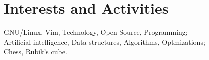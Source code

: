 \documentclass[a4paper,10pt]{article}
\begin{document}
\section{Interests and Activities}
    GNU/Linux, Vim, Technology, Open-Source, Programming; \\
    Artificial intelligence, Data structures, Algorithms, Optmizations; \\
    Chess, Rubik's cube.
\end{document}
